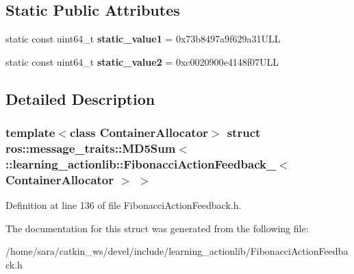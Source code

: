 \subsection*{Static Public Attributes}
\begin{DoxyCompactItemize}
\item 
\mbox{\label{structros_1_1message__traits_1_1MD5Sum_3_01_1_1learning__actionlib_1_1FibonacciActionFeedback___0b210292b08bbb91faddcdd7d543e740_a0c10d1aa9384459a7688b7a5ac472229}} 
static const uint64\+\_\+t {\bfseries static\+\_\+value1} = 0x73b8497a9f629a31\+U\+LL
\item 
\mbox{\label{structros_1_1message__traits_1_1MD5Sum_3_01_1_1learning__actionlib_1_1FibonacciActionFeedback___0b210292b08bbb91faddcdd7d543e740_afb2e4c1456cdd9679e8a2dbe9e8008a2}} 
static const uint64\+\_\+t {\bfseries static\+\_\+value2} = 0xc0020900e4148f07\+U\+LL
\end{DoxyCompactItemize}


\subsection{Detailed Description}
\subsubsection*{template$<$class Container\+Allocator$>$\newline
struct ros\+::message\+\_\+traits\+::\+M\+D5\+Sum$<$ \+::learning\+\_\+actionlib\+::\+Fibonacci\+Action\+Feedback\+\_\+$<$ Container\+Allocator $>$ $>$}



Definition at line 136 of file Fibonacci\+Action\+Feedback.\+h.



The documentation for this struct was generated from the following file\+:\begin{DoxyCompactItemize}
\item 
/home/sara/catkin\+\_\+ws/devel/include/learning\+\_\+actionlib/Fibonacci\+Action\+Feedback.\+h\end{DoxyCompactItemize}
